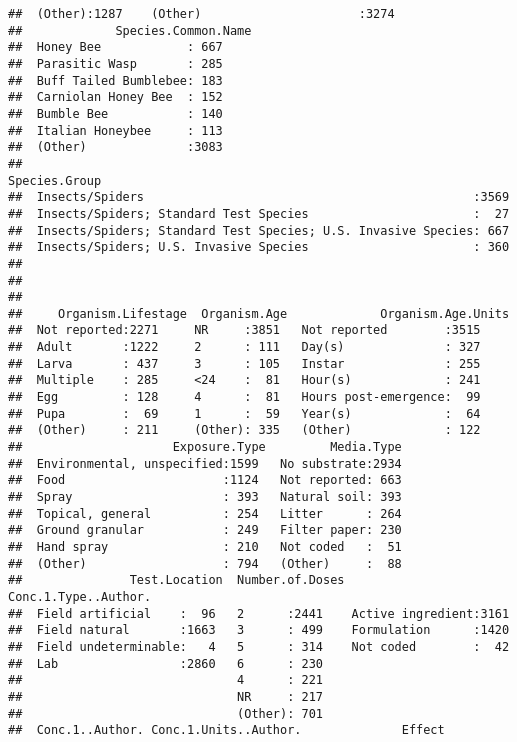 \documentclass[
  12pt,
]{article}
\begin{document}
\begin{verbatim}
##  (Other):1287    (Other)                      :3274      
##             Species.Common.Name
##  Honey Bee            : 667    
##  Parasitic Wasp       : 285    
##  Buff Tailed Bumblebee: 183    
##  Carniolan Honey Bee  : 152    
##  Bumble Bee           : 140    
##  Italian Honeybee     : 113    
##  (Other)              :3083    
##                                                        Species.Group 
##  Insects/Spiders                                              :3569  
##  Insects/Spiders; Standard Test Species                       :  27  
##  Insects/Spiders; Standard Test Species; U.S. Invasive Species: 667  
##  Insects/Spiders; U.S. Invasive Species                       : 360  
##                                                                      
##                                                                      
##                                                                      
##     Organism.Lifestage  Organism.Age             Organism.Age.Units
##  Not reported:2271     NR     :3851   Not reported        :3515    
##  Adult       :1222     2      : 111   Day(s)              : 327    
##  Larva       : 437     3      : 105   Instar              : 255    
##  Multiple    : 285     <24    :  81   Hour(s)             : 241    
##  Egg         : 128     4      :  81   Hours post-emergence:  99    
##  Pupa        :  69     1      :  59   Year(s)             :  64    
##  (Other)     : 211     (Other): 335   (Other)             : 122    
##                     Exposure.Type         Media.Type  
##  Environmental, unspecified:1599   No substrate:2934  
##  Food                      :1124   Not reported: 663  
##  Spray                     : 393   Natural soil: 393  
##  Topical, general          : 254   Litter      : 264  
##  Ground granular           : 249   Filter paper: 230  
##  Hand spray                : 210   Not coded   :  51  
##  (Other)                   : 794   (Other)     :  88  
##               Test.Location  Number.of.Doses        Conc.1.Type..Author.
##  Field artificial    :  96   2      :2441    Active ingredient:3161     
##  Field natural       :1663   3      : 499    Formulation      :1420     
##  Field undeterminable:   4   5      : 314    Not coded        :  42     
##  Lab                 :2860   6      : 230                               
##                              4      : 221                               
##                              NR     : 217                               
##                              (Other): 701                               
##  Conc.1..Author. Conc.1.Units..Author.              Effect    

\end{verbatim}
\end{document}
